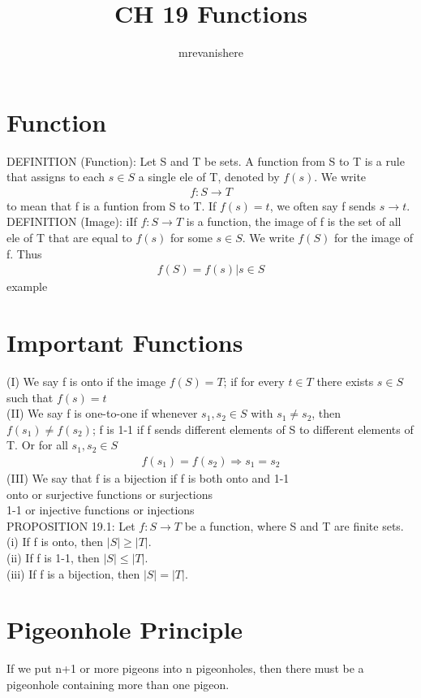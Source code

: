 \documentclass[12pt]{article}
\begin{document}
\title{CH 19 Functions}
\author{mrevanishere}
\maketitle


\section{Function}
	DEFINITION (Function): Let S and T be sets. A function from S to T is a rule that
	assigns to each $ s\in S $ a single ele of T, denoted by $ f(s) $. We
	write
	\begin{align*}
		f: S \to T
	\end{align*}
	to mean that f is a funtion from S to T. If $ f(s) = t $, we often say
	f sends $ s \to t $.\\
	DEFINITION (Image): iIf $ f: S \to T $ is a function, the image of f
	is the set of all ele of T that are equal to $ f(s) $ for some
	$ s\in S $. We write $ f(S) $ for the image of f. Thus
	\begin{align*}
		f(S) = {f(s)|s\in S}
	\end{align*}
	example
\section{Important Functions}
	(I) We say f is onto if the image $ f(S) = T $; if for every $ t \in T $
	there exists $ s \in S $ such that $ f(s) = t $ \\
	(II) We say f is one-to-one if whenever $ s_1, s_2 \in S $ with
	$ s_1 \ne s_2 $, then $ f(s_1) \ne f(s_2) $; f is 1-1 if f sends different
	elements of S to different elements of T. Or for all $ s_1, s_2 \in S $
	\begin{align*}
		f(s_1) = f(s_2) \Rightarrow s_1 = s_2
	\end{align*}
	(III) We say that f is a bijection if f is both onto and 1-1 \\
	onto or surjective functions or surjections \\
	1-1 or injective functions or injections \\
	PROPOSITION 19.1: Let $ f:S \to T $ be a function, where S and T
	are finite sets. \\
	(i) If f is onto, then $ |S| \ge |T| $. \\
	(ii) If f is 1-1, then $ |S| \le |T| $. \\
	(iii) If f is a bijection, then $ |S| = |T| $.
\section{Pigeonhole Principle}
	If we put n+1 or more pigeons into n pigeonholes, then there must be a 
	pigeonhole containing more than one pigeon.
\end{document}
